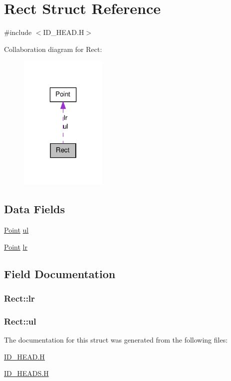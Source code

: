\hypertarget{structRect}{
\section{Rect Struct Reference}
\label{structRect}
}


{\ttfamily \#include $<$ID\_\-HEAD.H$>$}



Collaboration diagram for Rect:
\nopagebreak
\begin{figure}[H]
\begin{center}
\leavevmode
\includegraphics[width=118pt]{structRect__coll__graph}
\end{center}
\end{figure}
\subsection*{Data Fields}
\begin{DoxyCompactItemize}
\item 
\hyperlink{structPoint}{Point} \hyperlink{structRect_a32bc768c1a1e67705548d391111c79a8}{ul}
\item 
\hyperlink{structPoint}{Point} \hyperlink{structRect_a6bbfc36ca9a85e4c8ff919816abd7ca2}{lr}
\end{DoxyCompactItemize}


\subsection{Field Documentation}
\hypertarget{structRect_a6bbfc36ca9a85e4c8ff919816abd7ca2}{
\subsubsection[{lr}]{ {\bf Rect::lr}}}
\label{structRect_a6bbfc36ca9a85e4c8ff919816abd7ca2}
\hypertarget{structRect_a32bc768c1a1e67705548d391111c79a8}{
\subsubsection[{ul}]{ {\bf Rect::ul}}}
\label{structRect_a32bc768c1a1e67705548d391111c79a8}


The documentation for this struct was generated from the following files:\begin{DoxyCompactItemize}
\item 
\hyperlink{ID__HEAD_8H}{ID\_\-HEAD.H}\item 
\hyperlink{ID__HEADS_8H}{ID\_\-HEADS.H}\end{DoxyCompactItemize}
